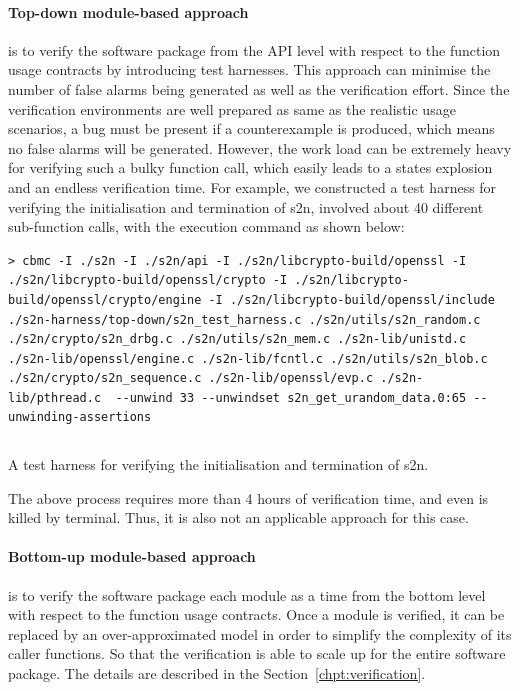 \paragraph{Top-down module-based approach} is to verify the software package from the API level with respect to the function usage contracts by introducing test harnesses. This approach can minimise the number of false alarms being generated as well as the  verification effort. Since the verification environments are well prepared as same as the realistic usage scenarios, a bug must be present if a counterexample is produced, which means no false alarms will be generated. However, the work load can be extremely heavy for verifying such a bulky function call, which easily leads to a states explosion and an endless verification time. For example, we constructed a test harness for verifying the initialisation and termination of s2n, involved about 40 different sub-function calls, with the execution command as shown below:

\begin{listing}[ht]
\begin{verbatim}
> cbmc -I ./s2n -I ./s2n/api -I ./s2n/libcrypto-build/openssl -I ./s2n/libcrypto-build/openssl/crypto -I ./s2n/libcrypto-build/openssl/crypto/engine -I ./s2n/libcrypto-build/openssl/include ./s2n-harness/top-down/s2n_test_harness.c ./s2n/utils/s2n_random.c ./s2n/crypto/s2n_drbg.c ./s2n/utils/s2n_mem.c ./s2n-lib/unistd.c ./s2n-lib/openssl/engine.c ./s2n-lib/fcntl.c ./s2n/utils/s2n_blob.c ./s2n/crypto/s2n_sequence.c ./s2n-lib/openssl/evp.c ./s2n-lib/pthread.c  --unwind 33 --unwindset s2n_get_urandom_data.0:65 --unwinding-assertions
\end{verbatim}
\inputminted[frame=single, breaklines, linenos, numbersep=5pt, tabsize=4, fontsize=\footnotesize, firstline=3]{c}{./contents/code/harnesses/s2n_test_harness.c}  %
\caption{A test harness for verifying the initialisation and termination of s2n.}
\label{listing:s2n_test_harness}
\end{listing}

The above process requires more than 4 hours of verification time, and even is killed by terminal. Thus, it is also not an applicable approach for this case.

\paragraph{Bottom-up module-based approach} is to verify the software package each module as a time from the bottom level with respect to the function usage contracts.
Once a module is verified, it can be replaced by an over-approximated model in order to simplify the complexity of its caller functions. So that the verification is able to scale up for the entire software package. The details are described in the Section~\ref{chpt:verification}.

